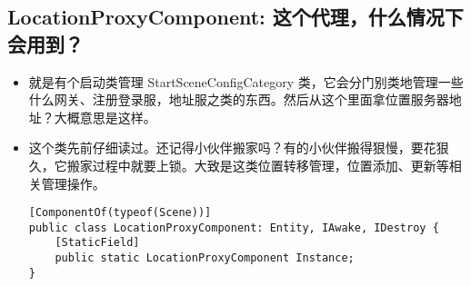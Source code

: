 \documentclass[9pt, b5paper]{article}
\begin{document}
\subsection{LocationProxyComponent: 这个代理，什么情况下会用到？}
\label{sec-8-4}
\begin{itemize}
\item 就是有个启动类管理 StartSceneConfigCategory 类，它会分门别类地管理一些什么网关、注册登录服，地址服之类的东西。然后从这个里面拿位置服务器地址？大概意思是这样。
\item 这个类先前仔细读过。还记得小伙伴搬家吗？有的小伙伴搬得狠慢，要花狠久，它搬家过程中就要上锁。大致是这类位置转移管理，位置添加、更新等相关管理操作。
\begin{verbatim}
[ComponentOf(typeof(Scene))]
public class LocationProxyComponent: Entity, IAwake, IDestroy {
    [StaticField]
    public static LocationProxyComponent Instance;
}
\end{verbatim}
\end{itemize}
\end{document}
